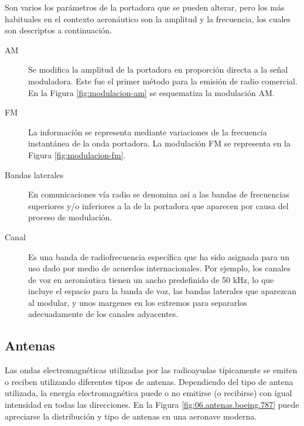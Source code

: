 Son varios los par\'ametros de la portadora que se pueden alterar, pero los m\'as habituales en el contexto aeron\'autico son la amplitud y la frecuencia, los cuales son descriptos a continuaci\'on.

\begin{description}

\item [AM] Se modifica la amplitud de la portadora en proporci\'on directa a la se\~nal moduladora. Este fue el primer m\'etodo para la emisi\'on de radio comercial. En la Figura \ref{fig:modulacion-am} se esquematiza la modulaci\'on AM.


\item [FM]La informaci\'on se representa mediante variaciones de la frecuencia instant\'anea de la onda portadora.
La modulaci\'on FM se representa en la Figura \ref{fig:modulacion-fm}.


\item [Bandas laterales] En comunicaciones v\'ia radio se denomina as\'i a las bandas de frecuencias su\-pe\-rio\-res y/o inferiores a la de la portadora que aparecen por causa del proceso de modulaci\'on.


\item [Canal] Es una banda de radiofrecuencia espec\'ifica que ha sido asignada para un uso dado por medio de acuerdos internacionales. Por ejemplo, los canales de voz en aeron\'autica tienen un ancho predefinido de 50 kHz, lo que incluye el espacio para la banda de voz, las bandas laterales que aparezcan al modular, y unos margenes en los extremos para separarlos adecuadamente de los canales adyacentes.  

\end{description}

\subsection{Antenas}
\label{sec:06.Antenas}

Las ondas electromagn\'eticas
  utilizadas por las radioayudas t\'ipicamente se emiten o reciben
  utilizando diferentes tipos de antenas. Dependiendo del tipo de
  antena utilizada, la energ\'ia electromagn\'etica puede o no
  emitirse (o recibirse) con igual intensidad en todas las
  direcciones. 
En la Figura \ref{fig:06.antenas.boeing.787} puede apreciarse la distribuci\'on y tipo de antenas en una aeronave 
moderna.


